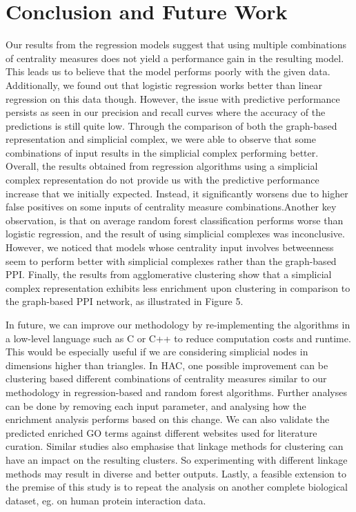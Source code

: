 \documentclass[9pt]{article}
\begin{document}
\section{Conclusion and Future Work}
Our results from the regression models suggest that using multiple combinations of centrality measures does not yield a performance gain in the resulting model. This leads us to believe that the model performs poorly with the given data. Additionally, we found out that logistic regression works better than linear regression on this data though. However, the issue with predictive performance persists as seen in our precision and recall curves where the accuracy of the predictions is still quite low. Through the comparison of both the graph-based representation and simplicial complex, we were able to observe that some combinations of input results in the simplicial complex performing better. Overall, the results obtained from regression algorithms using a simplicial complex representation do not provide us with the predictive performance increase that we initially expected. Instead, it significantly worsens due to higher false positives on some inputs of centrality measure combinations.Another key observation, is that on average random forest classification performs worse than logistic regression, and the result of using simplicial complexes was inconclusive. However, we noticed that models whose centrality input involves betweenness seem to perform better with simplicial complexes rather than the graph-based PPI. Finally, the results from agglomerative clustering show that a simplicial complex representation exhibits less enrichment upon clustering in comparison to the graph-based PPI network, as illustrated in Figure 5.
 \par
In future, we can improve our methodology by re-implementing the algorithms in a low-level language such as C or C++ to reduce computation costs and runtime. This would be especially useful if we are considering simplicial nodes in dimensions higher than triangles. In HAC, one possible improvement can be clustering based different combinations of centrality measures similar to our methodology in regression-based and random forest algorithms. Further analyses can be done by removing each input parameter, and analysing how the enrichment analysis performs based on this change. We can also validate the predicted enriched GO terms against different websites used for literature curation. Similar studies also emphasise that linkage methods for clustering can have an impact on the resulting clusters. So experimenting with different linkage methods may result in diverse and better outputs. Lastly, a feasible extension to the premise of this study is to repeat the analysis on another complete biological dataset, eg. on human protein interaction data.
\end{document}
